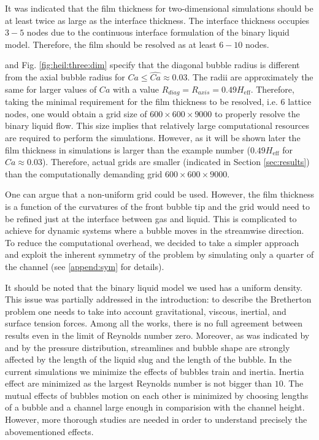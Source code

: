 \documentclass[preprint,12pt]{elsarticle}
\begin{document}
It was indicated \cite{kuzmin-binary2d} that the film thickness for two-dimensional simulations should be at least twice as large
as the interface thickness. The interface thickness occupies $3-5$ nodes due to the continuous
interface formulation of the binary liquid model. Therefore, the
film should be
resolved as at least $6-10$ nodes. 

\citet{heil-threedim} and Fig. \ref{fig:heil:three:dim} specify that the diagonal bubble radius is
different from the
axial bubble radius for $Ca\leq \widehat{Ca}\approx 0.03$. The radii are approximately the same for
larger values
of
$Ca$ with a value $R_{diag}=R_{axis}=0.49 H_{\mathrm{eff}}$. Therefore, taking the minimal
requirement for the film thickness to be
resolved, i.e. $6$ lattice nodes, one would obtain a grid size of $600\times 600 \times 9000 $ to
properly resolve the binary liquid flow. This size implies that relatively
large
computational resources are required to perform the simulations. {\color{red} However, as it will
be shown later the film thickness in simulations is larger than the example number ($0.49
H_{\mathrm{eff}}$ for $Ca\approx 0.03$). Therefore, actual grids are smaller (indicated in
Section \ref{sec:results}) than the computationally demanding grid $600 \times 600 \times 9000$.}

One can argue that a non-uniform grid could be used. However, the film thickness is a
function of the curvatures of the front bubble tip \cite{bretherton} and the grid would need to
be refined just at the interface between gas and liquid. This is complicated to achieve for
dynamic systems where a bubble moves in the streamwise direction.
To reduce the computational overhead, we decided to take a simpler approach and exploit the
inherent symmetry of the problem by simulating only a quarter of the channel (see
\ref{append:sym} for details).

It should be noted that the binary liquid model we used has a uniform density. This issue was
partially addressed in the introduction:  to describe the Bretherton problem one needs to take into
account gravitational, viscous, inertial, and surface tension forces. Among all the works, there
is no full 
agreement between results even in the limit of Reynolds number zero. Moreover,
as was indicated
by \citet{kreutzer-taylor} and by \citet{cerro-bubble-train} the pressure distribution, streamlines
and bubble shape are strongly affected by the length of the liquid slug and the length of the
bubble. In the current simulations we minimize the effects of bubbles train and inertia. Inertia
effect are minimized as the largest Reynolds number is not bigger than $10$. The mutual
effects of bubbles motion on each other is minimized by choosing lengths of a bubble and a
channel large enough in comparision with the channel height. However, more thorough studies are
needed in order to understand
precisely the abovementioned effects.
\end{document}
